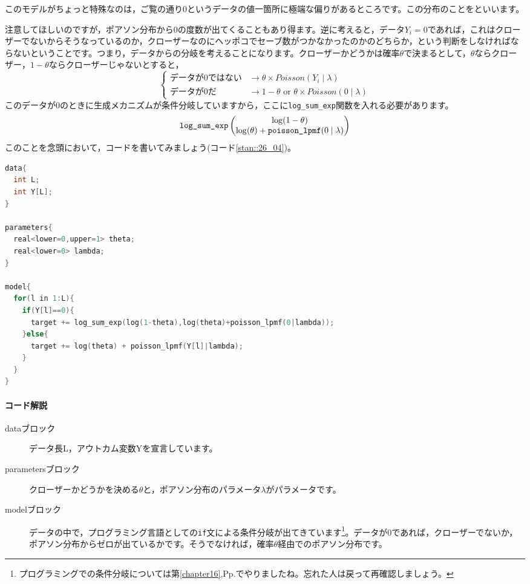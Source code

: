 \documentclass{ltjsbook}
\begin{document}
このモデルがちょっと特殊なのは，ご覧の通り0というデータの値一箇所に極端な偏りがあるところです。この分布のことをといいます。

注意してほしいのですが，ポアソン分布から0の度数が出てくることもあり得ます。逆に考えると，データ$Y_i=0$であれば，これはクローザーでないからそうなっているのか，クローザーなのにヘッポコでセーブ数がつかなかったのかのどちらか，という判断をしなければならないということです。つまり，データからの分岐を考えることになります。クローザーかどうかは確率$\theta$で決まるとして，$\theta$ならクローザー，$1-\theta$ならクローザーじゃないとすると，
\begin{equation}
    \left\{ \begin{array}{cc} \mbox{データが0ではない}&\to \theta \times Poisson(Y_i\mid\lambda)\\
                              \mbox{データが0だ}&\to 1-\theta \mbox{ or } \theta \times Poisson(0\mid\lambda) \end{array} \right.
\end{equation}
このデータが0のときに生成メカニズムが条件分岐していますから，ここに\verb|log_sum_exp|関数を入れる必要があります。
\begin{equation*}
    \verb|log_sum_exp| \begin{pmatrix} \log(1-\theta) \\ \log(\theta) + \verb|poisson_lpmf|(0\mid\lambda)\end{pmatrix}
\end{equation*}
このことを念頭において，コードを書いてみましょう(コード\ref{stan::26_04})。
\begin{lstlisting}[language=C++,label={stan::26_04},caption={ゼロ過剰ポアソン分布}]
data{
  int L;
  int Y[L];
}

parameters{
  real<lower=0,upper=1> theta;
  real<lower=0> lambda;
}

model{
  for(l in 1:L){
    if(Y[l]==0){
      target += log_sum_exp(log(1-theta),log(theta)+poisson_lpmf(0|lambda));
    }else{
      target += log(theta) + poisson_lpmf(Y[l]|lambda);
    }
  }
}
\end{lstlisting}
\paragraph{コード解説}
\begin{description}
    \item[dataブロック] データ長L，アウトカム変数Yを宣言しています。
    \item[parametersブロック] クローザーかどうかを決める$\theta$と，ポアソン分布のパラメータ$\lambda$がパラメータです。
    \item[modelブロック] データの中で，プログラミング言語としての\verb|if|文による条件分岐が出てきています\footnote{プログラミングでの条件分岐については第\ref{chapter16},Pp.\pageref{if_statement}でやりましたね。忘れた人は戻って再確認しましょう。}。データが0であれば，クローザーでないか，ポアソン分布からゼロが出ているかです。そうでなければ，確率$\theta$経由でのポアソン分布です。
\end{description}
\end{document}
